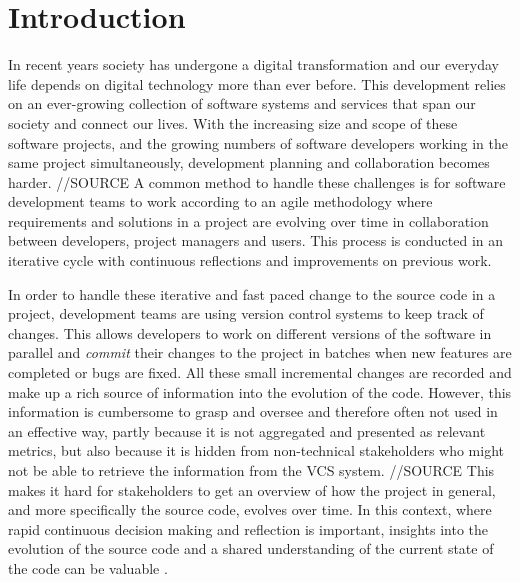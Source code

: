 

\section{Introduction}
In recent years society has undergone a digital transformation and our everyday life depends on digital technology more than ever before. 
This development relies on an ever-growing collection of software systems and services that span our society and connect our lives. 
With the increasing size and scope of these software projects, and the growing numbers of software developers working in the same project simultaneously, development planning and collaboration becomes harder. //SOURCE
A common method to handle these challenges is for software development teams to work according to an agile methodology \cite{hazzan_agile_2014} where requirements and solutions in a project are evolving over time in collaboration between developers, project managers and users. 
This process is conducted in an iterative cycle with continuous reflections and improvements on previous work.

In order to handle these iterative and fast paced change to the source code in a project, development teams are using version control systems to keep track of changes. 
This allows developers to work on different versions of the software in parallel and \textit{commit} their changes to the project in batches when new features are completed or bugs are fixed.
All these small incremental changes are recorded and make up a rich source of information into the evolution of the code. 
However, this information is cumbersome to grasp and oversee and therefore often not used in an effective way, partly because it is not aggregated and presented as relevant metrics, but also because it is hidden from non-technical stakeholders who might not be able to retrieve the information from the VCS system. //SOURCE
This makes it hard for stakeholders to get an overview of how the project in general, and more specifically the source code, evolves over time.
In this context, where rapid continuous decision making and reflection is important, insights into the evolution of the source code and a shared understanding of the current state of the code can be valuable \cite{ball_if_1997}.

